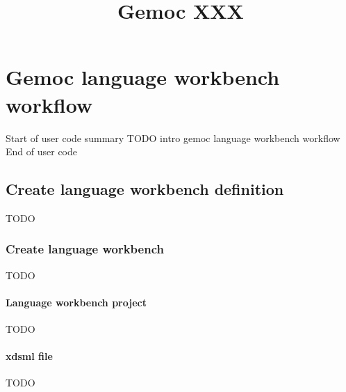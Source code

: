 \documentclass{gemoc} %
\title{Gemoc XXX }
\begin{document}
\maketitle

\begin{revisions}
	\begin{revtable}
		\dates{}{}{}{}{}
		\writers{}{}{}{}{}
		\approvers{}{}{}{}{}
	\end{revtable}
	\begin{revisionlabels}
		\revlabel{}
	\end{revisionlabels}
\end{revisions}

\begin{tableofauthors}
\end{tableofauthors}

\tableofcontents
\newpage

\chapter{Gemoc language workbench workflow}
Start of user code summary
	TODO intro gemoc language workbench workflow
End of user code
\section{Create language workbench definition}
\label{sec:Create_language_workbench_definition}

TODO

\subsection{Create language workbench}
TODO


\subsubsection{Language workbench project}
TODO
\subsubsection{xdsml file}
TODO
\end{document}
